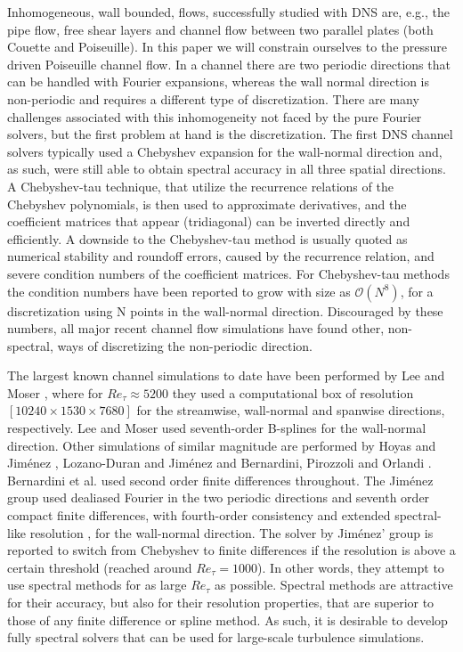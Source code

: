 \documentclass[11pt, oneside]{elsarticle}
\begin{document}
Inhomogeneous, wall bounded, flows, successfully studied with DNS are, e.g., the pipe flow, free shear layers and channel flow between two parallel plates (both Couette and Poiseuille). In this paper we will constrain ourselves to the pressure driven Poiseuille channel flow. In a channel there are two periodic directions that can be handled with Fourier expansions, whereas the wall normal direction is non-periodic and requires a different type of discretization. There are many challenges associated with this inhomogeneity not faced by the pure Fourier solvers, but the first problem at hand is the discretization. The first DNS channel solvers typically used a Chebyshev expansion for the wall-normal direction and, as such, were still able to obtain spectral accuracy in all three spatial directions. A Chebyshev-tau technique, that utilize the recurrence relations of the Chebyshev polynomials, is then used to approximate derivatives, and the coefficient matrices that appear (tridiagonal) can be inverted directly and efficiently. A downside to the Chebyshev-tau method is usually quoted \cite{canuto1988} as numerical stability and roundoff errors, caused by the recurrence relation, and severe condition numbers of the coefficient matrices. For Chebyshev-tau methods the condition numbers have been reported to grow with size as $\mathcal{O}(N^8)$, for a discretization using N points in the wall-normal direction. Discouraged by these numbers, all major recent channel flow simulations have found other, non-spectral, ways of discretizing the non-periodic direction. 


The largest known channel simulations to date have been performed by Lee and Moser \cite{leemoser15}, where for $Re_{\tau}\approx 5200$ they used a computational box of resolution $[10240 \times 1530 \times 7680]$ for the streamwise, wall-normal and spanwise directions, respectively. Lee and Moser used seventh-order B-splines for the wall-normal direction. Other simulations of similar magnitude are performed by Hoyas and Jim\'{e}nez \cite{hoyas06, hoyas08}, Lozano-Duran and Jim\'{e}nez \cite{Lozano2014} and Bernardini, Pirozzoli and Orlandi \cite{bernardini2014}. Bernardini et al. used second order finite differences throughout. The Jim\'{e}nez group used dealiased Fourier in the two periodic directions and seventh order compact finite differences, with fourth-order consistency and extended spectral-like resolution \cite{Lele92}, for the wall-normal direction. The solver by Jim\'{e}nez' group is reported to switch from Chebyshev to finite differences if the resolution is above a certain threshold \cite{hoyas08} (reached around $Re_{\tau}=1000$). In other words, they attempt to use spectral methods for as large $Re_{\tau}$ as possible. Spectral methods are attractive for their accuracy, but also for their resolution properties, that are superior to those of any finite difference or spline method. As such, it is desirable to develop fully spectral solvers that can be used for large-scale turbulence simulations.
\end{document}
